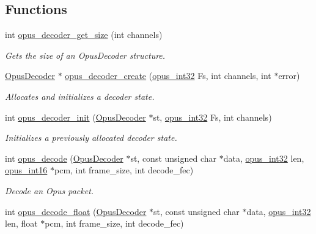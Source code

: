 \subsection*{Functions}
\begin{DoxyCompactItemize}
\item 
int \hyperlink{group__opus__decoder_gac918415b2ee21add75b7f867ce235011}{opus\+\_\+decoder\+\_\+get\+\_\+size} (int channels)
\begin{DoxyCompactList}\small\item\em Gets the size of an {\ttfamily Opus\+Decoder} structure. \end{DoxyCompactList}\item 
\hyperlink{group__opus__decoder_ga401d8579958d36094715a6b90cd159a6}{Opus\+Decoder} $\ast$ \hyperlink{group__opus__decoder_ga753f6fe0b699c81cfd47d70c8e15a0bd}{opus\+\_\+decoder\+\_\+create} (\hyperlink{opus__types_8h_aa4d309d6f80b99dbabebc8f98879ab9a}{opus\+\_\+int32} Fs, int channels, int $\ast$error)
\begin{DoxyCompactList}\small\item\em Allocates and initializes a decoder state. \end{DoxyCompactList}\item 
int \hyperlink{group__opus__decoder_ga939156d1f561c4273d5c62fa9c235a01}{opus\+\_\+decoder\+\_\+init} (\hyperlink{group__opus__decoder_ga401d8579958d36094715a6b90cd159a6}{Opus\+Decoder} $\ast$st, \hyperlink{opus__types_8h_aa4d309d6f80b99dbabebc8f98879ab9a}{opus\+\_\+int32} Fs, int channels)
\begin{DoxyCompactList}\small\item\em Initializes a previously allocated decoder state. \end{DoxyCompactList}\item 
int \hyperlink{group__opus__decoder_ga7d1111f64c36027ddcb81799df9b3fc9}{opus\+\_\+decode} (\hyperlink{group__opus__decoder_ga401d8579958d36094715a6b90cd159a6}{Opus\+Decoder} $\ast$st, const unsigned char $\ast$data, \hyperlink{opus__types_8h_aa4d309d6f80b99dbabebc8f98879ab9a}{opus\+\_\+int32} len, \hyperlink{opus__types_8h_acc9ed7cf60479eb81f9648c6ec27dc26}{opus\+\_\+int16} $\ast$pcm, int frame\+\_\+size, int decode\+\_\+fec)
\begin{DoxyCompactList}\small\item\em Decode an Opus packet. \end{DoxyCompactList}\item 
int \hyperlink{group__opus__decoder_ga9c554b8c0214e24733a299fe53bb3bd2}{opus\+\_\+decode\+\_\+float} (\hyperlink{group__opus__decoder_ga401d8579958d36094715a6b90cd159a6}{Opus\+Decoder} $\ast$st, const unsigned char $\ast$data, \hyperlink{opus__types_8h_aa4d309d6f80b99dbabebc8f98879ab9a}{opus\+\_\+int32} len, float $\ast$pcm, int frame\+\_\+size, int decode\+\_\+fec)

\end{DoxyCompactItemize}
